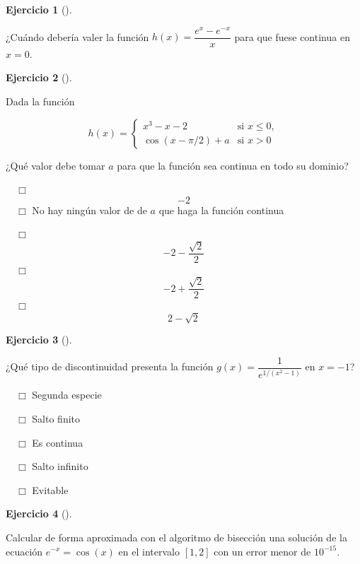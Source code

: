\documentclass[
  a4paper,
]{scrreport}
\theoremstyle{definition}
\newtheorem{exercise}{Ejercicio}[chapter]
\theoremstyle{remark}
\begin{document}
\leavevmode{}%
\begin{exercise}[]\label{exr-discontinuidad-evitable}

¿Cuándo debería valer la función \(h(x)=\dfrac{e^x-e^{-x}}{x}\) para que
fuese continua en \(x=0\).

\vspace{18pt}

\end{exercise}

\leavevmode{}%
\begin{exercise}[]\label{exr-continuidad-2}

Dada la función

\[
h(x)=
\begin{cases}
x^3-x-2 & \mbox{si } x\leq 0,\\
\cos(x-\pi/2)+a & \mbox{si } x>0
\end{cases}
\]

¿Qué valor debe tomar \(a\) para que la función sea continua en todo su
dominio?

${\quad\Box}$ $$-2$$
${\quad\Box}$ No hay ningún valor de de $a$ que haga la función continua

${\quad\Box}$ $$-2 - \frac{\sqrt{2}}{2}$$
${\quad\Box}$ $$-2+\frac{\sqrt{2}}{2}$$
${\quad\Box}$ $$2-\sqrt{2}$$

\end{exercise}

\leavevmode{}%
\begin{exercise}[]\label{exr-clasificacion-discontinuidad}

¿Qué tipo de discontinuidad presenta la función
\(g(x)=\dfrac{1}{e^{1/(x^2-1)}}\) en \(x=-1\)?

${\quad\Box}$ Segunda especie

${\quad\Box}$ Salto finito

${\quad\Box}$ Es continua

${\quad\Box}$ Salto infinito

${\quad\Box}$ Evitable

\end{exercise}

\leavevmode{}%
\begin{exercise}[]\label{exr-raices}

Calcular de forma aproximada con el algoritmo de bisección una solución
de la ecuación \(e^{-x}=\cos(x)\) en el intervalo \([1,2]\) con un error
menor de \(10^{-15}\).

\vspace{18pt}

\end{exercise}
\end{document}
